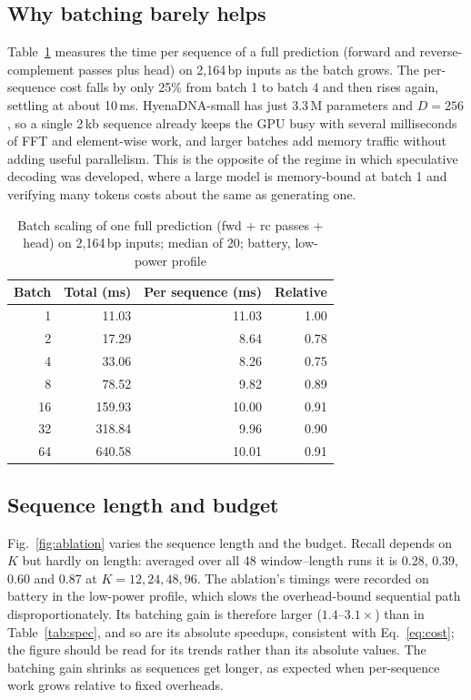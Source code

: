 \documentclass[conference]{IEEEtran}
\begin{document}
\subsection{Why batching barely helps}
Table~\ref{tab:batch} measures the time per sequence of a full prediction (forward and reverse-complement passes plus head) on 2{,}164\,bp inputs as the batch grows. The per-sequence cost falls by only 25\% from batch 1 to batch 4 and then rises again, settling at about 10\,ms. HyenaDNA-small has just 3.3\,M parameters and $D=256$, so a single 2\,kb sequence already keeps the GPU busy with several milliseconds of FFT and element-wise work, and larger batches add memory traffic without adding useful parallelism. This is the opposite of the regime in which speculative decoding was developed, where a large model is memory-bound at batch 1 and verifying many tokens costs about the same as generating one.

\begin{table}[t]
\centering
\caption{Batch scaling of one full prediction (fwd + rc passes + head) on 2{,}164\,bp inputs; median of 20; battery, low-power profile}
\label{tab:batch}
\begin{tabular}{rrrr}
\toprule
Batch & Total (ms) & Per sequence (ms) & Relative \\
\midrule
1 & 11.03 & 11.03 & 1.00 \\
2 & 17.29 & 8.64 & 0.78 \\
4 & 33.06 & 8.26 & 0.75 \\
8 & 78.52 & 9.82 & 0.89 \\
16 & 159.93 & 10.00 & 0.91 \\
32 & 318.84 & 9.96 & 0.90 \\
64 & 640.58 & 10.01 & 0.91 \\
\bottomrule
\end{tabular}
\end{table}

\subsection{Sequence length and budget}
Fig.~\ref{fig:ablation} varies the sequence length and the budget. Recall depends on $K$ but hardly on length: averaged over all 48 window--length runs it is 0.28, 0.39, 0.60 and 0.87 at $K=12,24,48,96$. The ablation's timings were recorded on battery in the low-power profile, which slows the overhead-bound sequential path disproportionately. Its batching gain is therefore larger ($1.4$--$3.1\times$) than in Table~\ref{tab:spec}, and so are its absolute speedups, consistent with Eq.~\eqref{eq:cost}; the figure should be read for its trends rather than its absolute values. The batching gain shrinks as sequences get longer, as expected when per-sequence work grows relative to fixed overheads.
\end{document}

